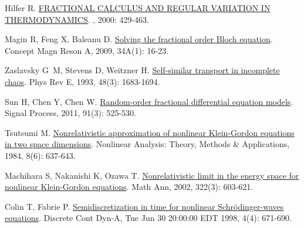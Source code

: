 \begin{thebibliography}{77}
    Hilfer R.
    \newblock \href{http://www.worldscientific.com/doi/abs/10.1142/9789812817747_0009}{{{FRACTIONAL CALCULUS AND REGULAR VARIATION IN THERMODYNAMICS}}}\allowbreak[M].
    , 2000: 429-463.
    
    Magin R, Feng X, Baleanu D.
    \newblock \href{https://onlinelibrary.wiley.com/doi/10.1002/cmr.a.20129}{Solving the fractional order {{Bloch}} equation}\allowbreak[J].
    \newblock Concept Magn Reson A, 2009, 34A\allowbreak (1): 16-23.
    
    Zaslavsky G~M, Stevens D, Weitzner H.
    \newblock \href{https://link.aps.org/doi/10.1103/PhysRevE.48.1683}{Self-similar transport in incomplete chaos}\allowbreak[J].
    \newblock Phys Rev E, 1993, 48\allowbreak (3): 1683-1694.
    
    Sun H, Chen Y, Chen W.
    \newblock \href{https://linkinghub.elsevier.com/retrieve/pii/S0165168410000447}{Random-order fractional differential equation models}\allowbreak[J].
    \newblock Signal Process, 2011, 91\allowbreak (3): 525-530.
    
    Tsutsumi M.
    \newblock \href{https://www.sciencedirect.com/science/article/pii/0362546X84900087}{Nonrelativistic approximation of nonlinear {{Klein-Gordon}} equations in two space dimensions}\allowbreak[J].
    \newblock Nonlinear Analysis: Theory, Methods \& Applications, 1984, 8\allowbreak (6): 637-643.
    
    Machihara S, Nakanishi K, Ozawa T.
    \newblock \href{http://link.springer.com/10.1007/s002080200008}{Nonrelativistic limit in the energy space for nonlinear {{Klein-Gordon}} equations}\allowbreak[J].
    \newblock Math Ann, 2002, 322\allowbreak (3): 603-621.
    
    Colin T, Fabrie P.
    \newblock \href{https://www.aimsciences.org/en/article/doi/10.3934/dcds.1998.4.671}{Semidiscretization in time for nonlinear {{Schr{\"o}dinger-waves}} equations}\allowbreak[J].
    \newblock Discrete Cont Dyn-A, Tue Jun 30 20:00:00 EDT 1998, 4\allowbreak (4): 671-690.
    

\end{thebibliography}
